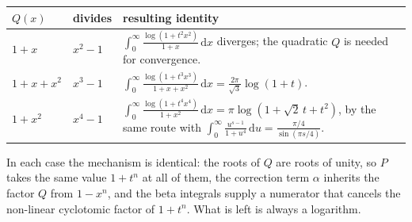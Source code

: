 \documentclass[12pt]{article}
\newcommand{\dd}{\,\mathrm{d}}
\begin{document}
\begin{center}
\small
\renewcommand{\arraystretch}{1.45}
\begin{tabularx}{\textwidth}{@{}>{\raggedright\arraybackslash}p{}>{\raggedright\arraybackslash}p{}X@{}}
\toprule
\(Q(x)\) & divides & resulting identity \\
\midrule
\(1+x\) & \(x^2-1\) &
\(\displaystyle\int_0^\infty\frac{\log(1+t^2x^2)}{1+x}\dd x\)
diverges; the quadratic \(Q\) is needed for convergence. \\
\addlinespace
\(1+x+x^2\) & \(x^3-1\) &
\(\displaystyle\int_0^\infty\frac{\log(1+t^3x^3)}{1+x+x^2}\dd x
=\frac{2\pi}{\sqrt3}\log(1+t)\). \\
\addlinespace
\(1+x^2\) & \(x^4-1\) &
\(\displaystyle\int_0^\infty\frac{\log(1+t^4x^4)}{1+x^2}\dd x
=\pi\log(1+\sqrt2\,t+t^2)\), by the same route with
\(\int_0^\infty\frac{u^{s-1}}{1+u^4}\dd u=\frac{\pi/4}{\sin(\pi s/4)}\). \\
\bottomrule
\end{tabularx}
\end{center}

In each case the mechanism is identical: the roots of \(Q\) are roots of
unity, so \(P\) takes the same value \(1+t^n\) at all of them, the
correction term \(\alpha\) inherits the factor \(Q\) from
\(1-x^n\), and the beta integrals supply a numerator that cancels the
non-linear cyclotomic factor of \(1+t^n\). What is left is always a
logarithm.
\end{document}
